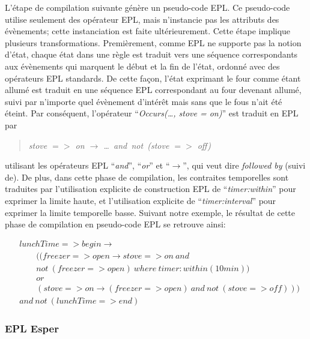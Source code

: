 L'étape de compilation suivante génère un pseudo-code EPL. Ce pseudo-code utilise seulement des opérateur EPL, mais n'instancie pas les attributs des évènements; cette instanciation est faite ultérieurement. Cette étape implique plusieurs transformations. Premièrement, comme EPL ne supporte pas la notion d'état, chaque état dans une règle est traduit vers une séquence correspondants aux évènements qui marquent le début et la fin de l'état, ordonné avec des opérateurs EPL standards. De cette façon, l'état exprimant le four comme étant allumé est traduit en une séquence EPL correspondant au four devenant allumé, suivi par n'importe quel évènement d'intérêt mais sans que le fous n'ait été éteint. Par conséquent, l'opérateur ``{\em Occurs(\dots, stove = on)}'' est traduit en EPL par 
\begin{quote} {\em stove $=>$ on $\rightarrow$ \dots\ and\ not\ (stove $=>$ off)} \end{quote}
\noindent 
utilisant les opérateurs EPL ``{\em and}'', ``{\em or}'' et ``$\rightarrow$'', qui veut dire {\em followed by} (suivi de). De plus, dans cette phase de compilation, les contraites temporelles sont traduites par l'utilisation explicite de construction EPL de ``{\em timer:within}'' pour exprimer la limite haute, et l'utilisation explicite de ``{\em timer:interval}'' pour exprimer la limite temporelle basse. Suivant notre exemple, le résultat de cette phase de compilation en pseudo-code EPL se retrouve ainsi:

\footnotesize
\begin{equation*}
  \begin{split}
&lunchTime=> begin \rightarrow\\
&\quad\quad ( ( freezer=> open \rightarrow  stove=> on\ and\\ 
&\quad\quad not\ ( freezer=> open )\ where\ timer:within(10min) )\\ 
&\quad\quad or\\  
&\quad\quad ( stove=> on \rightarrow  ( freezer=> open )\ and\ not\ ( stove=> off ) ) )  \\
&and\ not\ ( lunchTime=> end )
  \end{split}
\end{equation*}
\normalsize

\subsubsection{EPL Esper}

